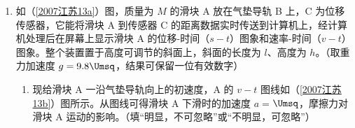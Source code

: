 \documentclass[\gkver]{gaokaozhenti}
\begin{document}
\begin{enumerate}
\begin{enumerate}
	①根据以上数据，电压表是并联在 M 与\tkanswer[1.2cm]{}之间的（填“O”或“P”）；
	
	②根据以上数据，画出该元件的伏安特性曲线。
	
	\onepicture[h=6.24cm]{}
	
	\item
	画出待测元件两端电压 $U_{\mathrm{MO}}$ 随 MN 间电压 $U_{\mathrm{MN}}$ 变化的示意图。（无需数值）
	
	\onepicture[w=4.05cm]{}
\end{enumerate}


\item
如（\ref{2007江苏13a}）图，质量为 $M$ 的滑块 A 放在气垫导轨 B 上，C 为位移传感器，它能将滑块 A 到传感器 C 的距离数据实时传送到计算机上，经计算机处理后在屏幕上显示滑块 A 的位移-时间（$s-t$）图象和速率-时间（$v-t$）图象。整个装置置于高度可调节的斜面上，斜面的长度为 $l$、高度为 $h$。（取重力加速度 $g=9.8\Umsq$，结果可保留一位有效数字）

\begin{enumerate}
	\item
	现给滑块 A 一沿气垫导轨向上的初速度，A 的 $v-t$ 图线如（\ref{2007江苏13b}）图所示。从图线可得滑块 A 下滑时的加速度 $a=$\tkanswer[1.5cm]{}$\Umsq$，摩擦力对滑块 A 运动的影响\tkanswer[3.0cm]{}。（填“明显，不可忽略”或“不明显，可忽略”）
	

\end{enumerate}
\end{enumerate}
\end{document}
